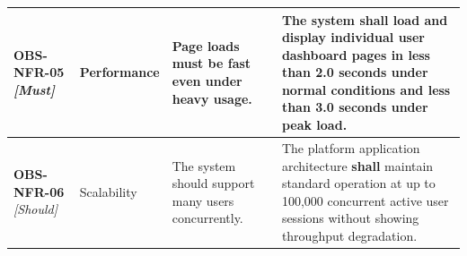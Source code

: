 \documentclass[11pt,a4paper]{article}
\begin{document}
\begin{table}[H]
\begin{tabular}{p{2.0cm} p{2.2cm} p{3.8cm} p{5.4cm}}
\textbf{OBS-NFR-05} \newline \textit{\small [Must]} & Performance & Page loads must be fast even under heavy usage. & The system \textbf{shall} load and display individual user dashboard pages in less than 2.0 seconds under normal conditions and less than 3.0 seconds under peak load. \\ \midrule

\textbf{OBS-NFR-06} \newline \textit{\small [Should]} & Scalability & The system should support many users concurrently. & The platform application architecture \textbf{shall} maintain standard operation at up to 100,000 concurrent active user sessions without showing throughput degradation. \\ \bottomrule
\end{tabular}
\end{table}

\newpage
\end{document}

